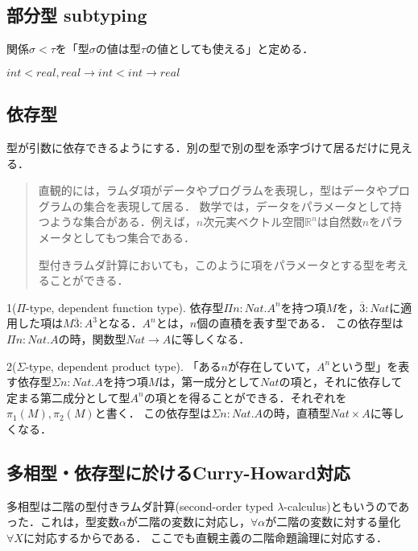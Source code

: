 \documentclass[uplatex, 12pt, dvipdfmx]{jsreport}
\begin{document}
\subsection{部分型 subtyping}

関係$\sigma<\tau$を「型$\sigma$の値は型$\tau$の値としても使える」と定める．
\begin{example}
    $int<real, real\to int<int\to real$
\end{example}

\subsection{依存型}
型が引数に依存できるようにする．別の型で別の型を添字づけて居るだけに見える．
\begin{quotation}
    直観的には，ラムダ項がデータやプログラムを表現し，型はデータやプログラムの集合を表現して居る．
    数学では，データをパラメータとして持つような集合がある．例えば，$n$次元実ベクトル空間$\mathbb{R}^n$は自然数$n$をパラメータとしてもつ集合である．

    型付きラムダ計算においても，このように項をパラメータとする型を考えることができる．\cite{論理と計算のしくみ}
\end{quotation}

\begin{example}
    1($\Pi$-type, dependent function type). 依存型$\Pi n:Nat.A^n$を持つ項$M$を，$\overline{3}:Nat$に適用した項は$M\overline{3}:A^3$となる．$A^n$とは，$n$個の直積を表す型である．
    この依存型は$\Pi n:Nat.A$の時，関数型$Nat\to A$に等しくなる．

    2($\Sigma$-type, dependent product type). 「ある$n$が存在していて，$A^n$という型」を表す依存型$\Sigma n:Nat.A$を持つ項$M$は，第一成分として$Nat$の項と，それに依存して定まる第二成分として型$A^n$の項とを得ることができる．それぞれを$\pi_1(M),\pi_2(M)$と書く．
    この依存型は$\Sigma n:Nat.A$の時，直積型$Nat\times A$に等しくなる．
\end{example}

\subsection{多相型・依存型に於けるCurry-Howard対応}
多相型は二階の型付きラムダ計算(second-order typed $\lambda$-calculus)ともいうのであった．これは，型変数$\alpha$が二階の変数に対応し，$\forall\alpha$が二階の変数に対する量化$\forall X$に対応するからである．
ここでも直観主義の二階命題論理に対応する．
\end{document}
